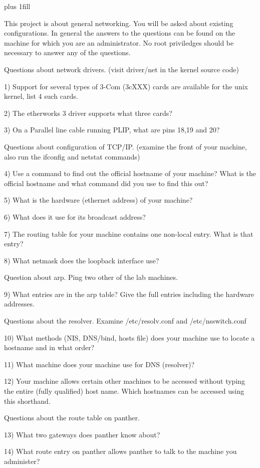 
\rightskip=0pt plus 1fill

\parindent 0pt

This project is about general networking.
You will be asked about existing configurations. 
In general the answers to the questions can be found on the machine for
which you are an administrator.
No root priviledges should be necessary to answer any of the questions.

Questions about network drivers.
(visit {\ltt{}driver/net} in the kernel source code)

1) Support for several types of 3-Com (3cXXX) cards are available
for the unix kernel, list 4 such cards.

2) The etherworks 3 driver supports what three cards?

3) On a Parallel line cable running PLIP, what are pins 18,19 and 20?

Questions about configuration of TCP/IP.
(examine the front of your machine, also run the ifconfig and netstat commands)

4) Use a command to find out the official hostname of your machine?
What is the official hostname and what command did you use to find this out?

5) What is the hardware (ethernet address) of your machine?

6) What does it use for its broadcast address?

7) The routing table for your machine contains one non-local entry.
What is that entry?

8) What netmask does the loopback interface use?

Question about arp.  Ping two other of the lab machines. 

9) What entries are in the arp table?
Give the full entries including the hardware addresses.

Questions about the resolver. 
Examine {\ltt{}/etc/resolv.conf} and {\ltt{}/etc/nsswitch.conf}

10) What methods (NIS, DNS/bind, hosts file) does your machine use
to locate a hostname and in what order?

11) What machine does your machine use for DNS (resolver)?

12) Your machine allows certain other machines to be accessed without
typing the entire (fully qualified) host name. Which hostnames can
be accessed using this shorthand.

Questions about the route table on {\ltt{}panther}.

13) What two gateways does {\ltt{}panther} know about?

14) What route entry on {\ltt{}panther} allows {\ltt{}panther}
to talk to the machine you administer?
\bye

